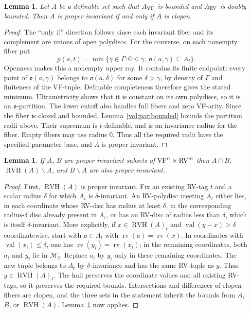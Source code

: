 \documentclass[12pt]{amsart}
\theoremstyle{plain}
\newtheorem{lem}[thm]{Lemma}
\theoremstyle{definition}
\theoremstyle{remark}
\numberwithin{equation}{section}
\theoremstyle{plain}
\newcommand{\VF}{\textup{VF}}
\newcommand{\RV}{\textup{RV}}
\newcommand{\MM}{\mdl M}
\newcommand{\go}{\mathfrak{o}}
\newcommand{\0}{\emptyset}
\newcommand{\mdl}[1]{\mathcal{#1}}  %
\newcommand{\sub}{\subseteq}
\newcommand{\mi}{\smallsetminus}
\DeclareMathOperator{\rv}{rv}
\DeclareMathOperator{\vv}{val}
\DeclareMathOperator{\RVH}{RVH}
\begin{document}
\begin{lem}\label{inv:crit}
Let $A$ be a definable set such that $A_{\VF}$ is bounded and $A_{\RV}$ is doubly bounded. Then $A$ is proper invariant if and only if $A$ is clopen.
\end{lem}
\begin{proof}
The ``only if'' direction follows since each invariant fiber and its complement are unions of open polydiscs. For the converse, on each nonempty fiber put
\[
p(a,t)=\min\{\gamma\in\Gamma:0\leq\gamma,\ \go(a,\gamma)\sub A_t\}.
\]
Openness makes this a nonempty upper ray. It contains its finite endpoint: every point of $\go(a,\gamma)$ belongs to $\go(a,\delta)$ for some $\delta>\gamma$, by density of $\Gamma$ and finiteness of the VF-tuple. Definable completeness therefore gives the stated minimum. Ultrametricity shows that it is constant on its own polydiscs, so it is an $\go$-partition. The lower cutoff also handles full fibers and zero VF-arity. Since the fiber is closed and bounded, Lemma~\ref{vol:par:bounded} bounds the partition radii above. Their supremum is $t$-definable, and is an invariance radius for the fiber. Empty fibers may use radius $0$. Thus all the required radii have the specified parameter base, and $A$ is proper invariant.
\end{proof}


\begin{lem}\label{int:inv}
If $A$, $B$ are proper invariant subsets of $\VF^n \times \RV^m$ then $A \cap B$, $\RVH(A) \mi A$, and $B \mi A$ are also proper invariant.
\end{lem}
\begin{proof}
First, $\RVH(A)$ is proper invariant. Fix an existing RV-tag $t$ and a scalar radius $\delta$ for which $A_t$ is $\delta$-invariant. An RV-polydisc meeting $A_t$ either lies, in each coordinate whose RV-disc has radius at least $\delta$, in the corresponding radius-$\delta$ disc already present in $A_t$, or has an RV-disc of radius less than $\delta$, which is itself $\delta$-invariant. More explicitly, if $x\in\RVH(A)_t$ and $\vv(y-x)>\delta$ coordinatewise, start with $a\in A_t$ with $\rv(a)=\rv(x)$. In coordinates with $\vv(x_i)\leq\delta$, one has $\rv(y_i)=\rv(x_i)$; in the remaining coordinates, both $a_i$ and $y_i$ lie in $\MM_\delta$. Replace $a_i$ by $y_i$ only in these remaining coordinates. The new tuple belongs to $A_t$ by $\delta$-invariance and has the same RV-tuple as $y$. Thus $y\in\RVH(A)_t$. The hull preserves the coordinate values and all existing RV-tags, so it preserves the required bounds. Intersections and differences of clopen fibers are clopen, and the three sets in the statement inherit the bounds from $A$, $B$, or $\RVH(A)$. Lemma~\ref{inv:crit} now applies.
\end{proof}
\end{document}
